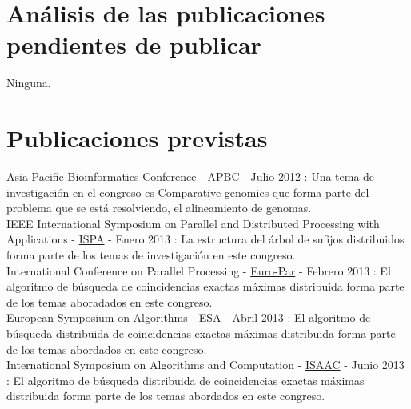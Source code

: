 \documentclass[12pt,a4paper]{article}
\begin{document}
\section{Análisis de las publicaciones pendientes de publicar}
\noindent
Ninguna.
\section{Publicaciones previstas}
Asia Pacific Bioinformatics Conference - \href{http://www.apbc2013.org/}{APBC} - Julio 2012 : Una tema de investigación en el congreso es Comparative genomics que forma parte del problema que se está resolviendo, el alineamiento de genomas.\\
IEEE International Symposium on Parallel and Distributed Processing with Applications - \href{http://www.arcos.inf.uc3m.es/ispa12/}{ISPA} - Enero 2013 : La estructura del árbol de sufijos distribuidos forma parte de los temas de investigación en este congreso.\\
International Conference on Parallel Processing - \href{http://www.grs-sim.de/news-events/news-archive/euro-par-2013.html}{Euro-Par} - Febrero 2013 : El algoritmo de búsqueda de coincidencias exactas máximas distribuida forma parte de los temas aboradados en este congreso.\\
European Symposium on Algorithms - \href{http://esa-symposium.org/}{ESA} - Abril 2013 : El algoritmo de búsqueda distribuida de coincidencias exactas máximas distribuida forma parte de los temas abordados en este congreso.\\
International Symposium on Algorithms and Computation - \href{http://www.is.titech.ac.jp/isaac11/}{ISAAC} - Junio 2013 :  El algoritmo de búsqueda distribuida de coincidencias exactas máximas distribuida forma parte de los temas abordados en este congreso.\\
\end{document}
